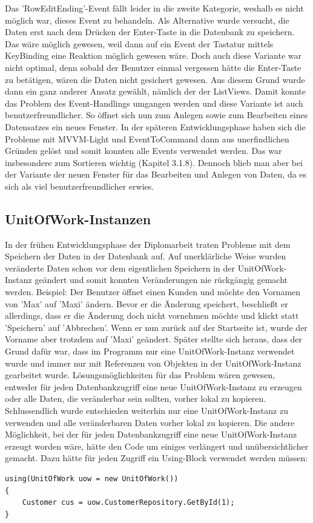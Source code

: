 Das 'RowEditEnding'-Event fällt leider in die zweite Kategorie, weshalb es nicht möglich war, dieses Event zu behandeln. Als Alternative wurde versucht, die Daten erst nach dem Drücken der Enter-Taste in die Datenbank zu speichern. Das wäre möglich gewesen, weil dann auf ein Event der Tastatur mittels KeyBinding eine Reaktion möglich gewesen wäre. Doch auch diese Variante war nicht optimal, denn sobald der Benutzer einmal vergessen hätte die Enter-Taste zu betätigen, wären die Daten nicht gesichert gewesen. Aus diesem Grund wurde dann ein ganz anderer Ansatz gewählt, nämlich der der ListViews. Damit konnte das Problem des Event-Handlings umgangen werden und diese Variante ist auch benutzerfreundlicher. So öffnet sich nun zum Anlegen sowie zum Bearbeiten eines Datensatzes ein neues Fenster. \newline In der späteren Entwicklungsphase haben sich die Probleme mit MVVM-Light und EventToCommand dann aus unerfindlichen Gründen gelöst und somit konnten alle Events verwendet werden. Das war insbesondere zum Sortieren wichtig (Kapitel 3.1.8). Dennoch blieb man aber bei der Variante der neuen Fenster für das Bearbeiten und Anlegen von Daten, da es sich als viel benutzerfreundlicher erwies.
\subsection{UnitOfWork-Instanzen}
In der frühen Entwicklungsphase der Diplomarbeit traten Probleme mit dem Speichern der Daten in der Datenbank auf. Auf unerklärliche Weise wurden veränderte Daten schon vor dem eigentlichen Speichern in der UnitOfWork-Instanz geändert und somit konnten Veränderungen nie rückgängig gemacht werden. \newline Beispiel: Der Benutzer öffnet einen Kunden und möchte den Vornamen von 'Max' auf 'Maxi' ändern. Bevor er die Änderung speichert, beschließt er allerdings, dass er die Änderung doch nicht vornehmen möchte und klickt statt 'Speichern' auf 'Abbrechen'. Wenn er nun zurück auf der Startseite ist, wurde der Vorname aber trotzdem auf 'Maxi' geändert. \newline Später stellte sich heraus, dass der Grund dafür war, dass im Programm nur eine UnitOfWork-Instanz verwendet wurde und immer nur mit Referenzen von Objekten in der UnitOfWork-Instanz gearbeitet wurde. Lösungsmöglichkeiten für das Problem wären gewesen, entweder für jeden Datenbankzugriff eine neue UnitOfWork-Instanz zu erzeugen oder alle Daten, die veränderbar sein sollten, vorher lokal zu kopieren. Schlussendlich wurde entschieden weiterhin nur eine UnitOfWork-Instanz zu verwenden und alle veränderbaren Daten vorher lokal zu kopieren. Die andere Möglichkeit, bei der für jeden Datenbankzugriff eine neue UnitOfWork-Instanz erzeugt worden wäre, hätte den Code um einiges verlängert und unübersichtlicher gemacht. Dazu hätte für jeden Zugriff ein Using-Block verwendet werden müssen:  
\begin{lstlisting}
using(UnitOfWork uow = new UnitOfWork())
{
	Customer cus = uow.CustomerRepository.GetById(1);
}
\end{lstlisting}